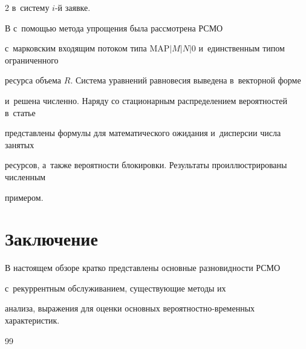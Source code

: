 \begin{multicols}{2}
в~сис\-те\-му $i$-й заявке.





В \cite{Sopin_17_2018} с~помощью метода упрощения была рассмотрена РСМО 


с~марковским входящим потоком типа $\mathrm{MAP}|M|N|0$ и~единственным типом ограниченного 


ресурса объема $R$. Система уравнений равновесия выведена в~векторной форме 


и~решена численно. Наряду со стационарным распределением вероятностей в~статье 


представлены формулы для математического ожидания и~дисперсии числа занятых 


ресурсов, а~также вероятности блокировки. Результаты проиллюстрированы численным 


примером.





\vspace*{-9pt}





\section{Заключение}





В настоящем обзоре кратко представлены основные разновидности РСМО


 с~рекуррентным обслуживанием, существующие методы их 


анализа, выражения для оценки основных ве\-ро\-ят\-но\-ст\-но-вре\-мен\-ных характеристик.





\vspace*{-9pt}





{\small\frenchspacing


 {%




 \begin{thebibliography}{99}










\end{thebibliography}}}
\end{multicols}
